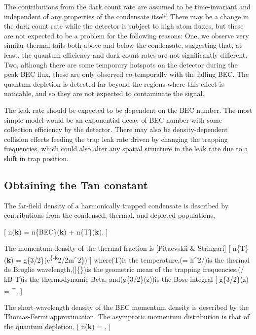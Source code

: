 The contributions from the dark count rate are assumed to be
time-invariant and independent of any properties of the condensate
itself. There may be a change in the dark count rate while the detector
is subject to high atom fluxes, but these are not expected to be a
problem for the following reasons: One, we observe very similar thermal
tails both above and below the condensate, suggesting that, at least,
the quantum efficiency and dark count rates are not significantly
different. Two, although there are some temporary hotspots on the
detector during the peak BEC flux, these are only observed co-temporally
with the falling BEC. The quantum depletion is detected far beyond the
regions where this effect is noticable, and so they are not expected to
contaminate the signal.

The leak rate should be expected to be dependent on the BEC number. The
most simple model would be an exponential decay of BEC number with some
collection efficiency by the detector. There may also be
density-dependent collision effects feeding the trap leak rate driven by
changing the trapping frequencies, which could also alter any spatial
structure in the leak rate due to a shift in trap position.

\hypertarget{obtaining-the-tan-constant}{%
\subsection{Obtaining the Tan
constant}\label{obtaining-the-tan-constant}}

The far-field density of a harmonically trapped condensate is described
by contributions from the condensed, thermal, and depleted populations,

{[} n(\textbf{k}) = n\{BEC\}(\textbf{k}) + n\{T\}(\textbf{k}). {]}

The momentum density of the thermal fraction is {[}Pitaevskii \&
Stringari{]} {[} n\{T\}(\textbf{k}) =
g\{3/2\}\left(e\textsuperscript{\{-\beta k}2/2m\hbar\^{}2\}\right) {]}
where(T)is the temperature,(\lambdaT = h\^{}2/)is the
thermal de Broglie wavelength,(\bar\{\omega\})is the geometric mean of
the trapping frequencies,(/ kB T)is the thermodynamic Beta,
and(g\{3/2\}(z))is the Bose integral {[} g\{3/2\}(z) =
\textsuperscript{\infty {}=}\infty {}.
{]}

The short-wavelength density of the BEC momentum density is described by
the Thomas-Fermi approximation. The asymptotic momentum distribution is
that of the quantum depletion, {[} n(\textbf{k}) =
, {]}

